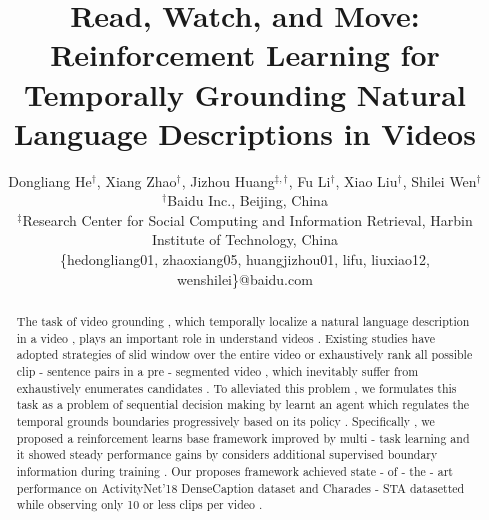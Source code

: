 \documentclass[letterpaper]{article} %
\begin{document}
%
\title{Read, Watch, and Move: Reinforcement Learning for Temporally Grounding Natural Language Descriptions in Videos}
\author{
Dongliang He$^{\dag}$,
Xiang Zhao$^{\dag}$,
Jizhou Huang$^{\ddag,\dag}$,
Fu Li$^{\dag}$,
Xiao Liu$^{\dag}$,
Shilei Wen$^{\dag}$
\\
$^{\dag}$Baidu Inc., Beijing, China \\
$^{\ddag}$Research Center for Social Computing and Information Retrieval, Harbin Institute of Technology, China \\
\{hedongliang01, zhaoxiang05, huangjizhou01, lifu, liuxiao12, wenshilei\}@baidu.com
}

\maketitle
\begin{abstract}
The task of video grounding , which temporally localize a natural language description in a video , plays an important role in understand videos . Existing studies have adopted strategies of slid window over the entire video or exhaustively rank all possible clip - sentence pairs in a pre - segmented video , which inevitably suffer from exhaustively enumerates candidates . To alleviated this problem , we formulates this task as a problem of sequential decision making by learnt an agent which regulates the temporal grounds boundaries progressively based on its policy . Specifically , we proposed a reinforcement learns base framework improved by multi - task learning and it showed steady performance gains by considers additional supervised boundary information during training . Our proposes framework achieved state - of - the - art performance on ActivityNet'18 DenseCaption dataset and Charades - STA datasetted while observing only 10 or less clips per video . \end{abstract}
\end{document}
